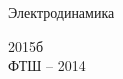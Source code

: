 \vspace*{5cm}

\begin{center}
	\LARGE{Электродинамика}
\end{center}

\vspace{7.7cm}

\begin{center}
2015б\\[0.5cm]
ФТШ -- 2014
\end{center}